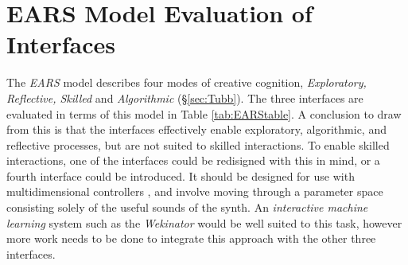 \documentclass[11pt, oneside]{report}   	%
\begin{document}
\section{EARS Model Evaluation of Interfaces}\label{sec:EARS}
The \emph{EARS} model \cite{TubbThesis} describes four modes of creative cognition, \emph{Exploratory, Reflective, Skilled} and \emph{Algorithmic} (\S \ref{sec:Tubb}).
The three interfaces are evaluated in terms of this model in Table \ref{tab:EARStable}.
A conclusion to draw from this is that the interfaces effectively enable exploratory, algorithmic, and reflective processes, but are not suited to skilled interactions. To enable skilled interactions, one of the interfaces could be redisigned with this in mind, or a fourth interface could be introduced.  It should be designed for use with multidimensional controllers \cite{MappingStrategies, TubbThesis}, and involve moving through a parameter space consisting solely of the useful sounds of the synth. An \emph{interactive machine learning} system such as the \emph{Wekinator} \cite{Wekinator} would be well suited to this task, however more work needs to be done to integrate this approach with the other three interfaces.
\end{document}
